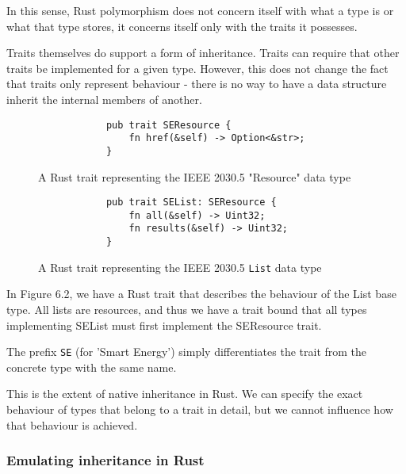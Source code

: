 In this sense, Rust polymorphism does not concern itself with what a type is or what that type stores, it concerns itself only with the traits it possesses.

Traits themselves do support a form of inheritance. Traits can require that other traits be implemented for a given type. However, this does not change the fact that traits only represent behaviour - 
there is no way to have a data structure inherit the internal members of another.

\begin{figure}[H]
    \begin{center}
        \begin{lstlisting}
            pub trait SEResource {
                fn href(&self) -> Option<&str>;
            }
        \end{lstlisting}
        \caption{A Rust trait representing the IEEE 2030.5 "Resource" data type}
    \end{center}
\end{figure}



\begin{figure}[H]
    \begin{center}
        \begin{lstlisting}
            pub trait SEList: SEResource {
                fn all(&self) -> Uint32;
                fn results(&self) -> Uint32;
            }
        \end{lstlisting}
        \caption{A Rust trait representing the IEEE 2030.5 \texttt{List} data type}
    \end{center}
\end{figure}

In Figure 6.2, we have a Rust trait that describes the behaviour of the List base type. All lists are resources, and thus we have a trait bound that all types implementing SEList must first implement the SEResource trait.

The prefix \texttt{SE} (for 'Smart Energy') simply differentiates the trait from the concrete type with the same name.

This is the extent of native inheritance in Rust. We can specify the exact behaviour of types that belong to a trait in detail, but we cannot influence how that behaviour is achieved.

\subsubsection{Emulating inheritance in Rust}

